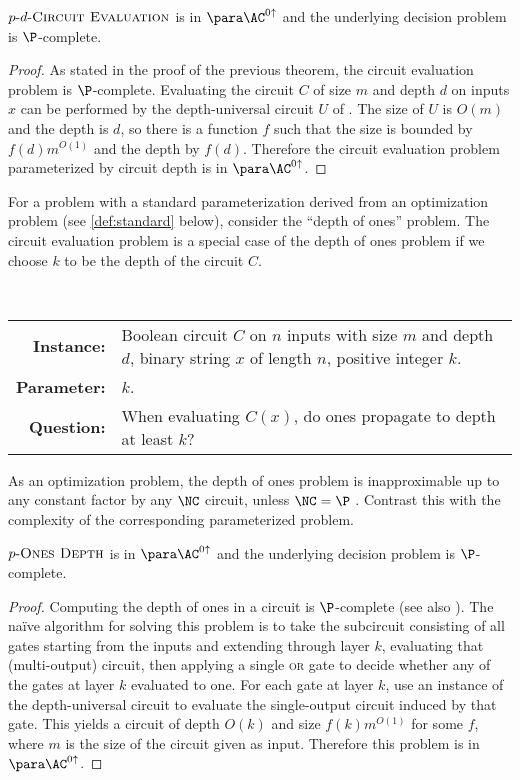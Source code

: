 \begin{theorem}\label{thm:cvpdepth}
  $p \textnormal{-} d \textnormal{-} \textsc{Circuit Evaluation}$ is in $\para \AC^{0 \uparrow}$ and the underlying decision problem is $\P$-complete.
\end{theorem}
\begin{proof}
  As stated in the proof of the previous theorem, the circuit evaluation problem is $\P$-complete.
  Evaluating the circuit $C$ of size $m$ and depth $d$ on inputs $x$ can be performed by the depth-universal circuit $U$ of \autocite{ch85}.
  The size of $U$ is $O(m)$ and the depth is $d$, so there is a function $f$ such that the size is bounded by $f(d) m^{O(1)}$ and the depth by $f(d)$.
  Therefore the circuit evaluation problem parameterized by circuit depth is in $\para \AC^{0 \uparrow}$.
\end{proof}

For a problem with a standard parameterization derived from an optimization problem (see \autoref{def:standard} below), consider the ``depth of ones'' problem.
The circuit evaluation problem is a special case of the depth of ones problem if we choose $k$ to be the depth of the circuit $C$.

\begin{definition}
  \mbox{} \\
  \begin{tabular}{r p{9.2cm}}
    \textbf{Instance:} & Boolean circuit $C$ on $n$ inputs with size $m$ and depth $d$, binary string $x$ of length $n$, positive integer $k$. \\
    \textbf{Parameter:} & $k$. \\
    \textbf{Question:} & When evaluating $C(x)$, do ones propagate to depth at least $k$?
  \end{tabular}
\end{definition}

As an optimization problem, the depth of ones problem is inapproximable up to any constant factor by any $\NC$ circuit, unless $\NC = \P$ \autocite{ks88}.
Contrast this with the complexity of the corresponding parameterized problem.

\begin{theorem}
  $p \textnormal{-} \textsc{Ones Depth}$ is in $\para \AC^{0 \uparrow}$ and the underlying decision problem is $\P$-complete.
\end{theorem}
\begin{proof}
  Computing the depth of ones in a circuit is $\P$-complete \autocite{ks88} (see also \autocite[Problem~A.1.10]{ghr95}).
  The naïve algorithm for solving this problem is to take the subcircuit consisting of all gates starting from the inputs and extending through layer $k$, evaluating that (multi-output) circuit, then applying a single \textsc{or} gate to decide whether any of the gates at layer $k$ evaluated to one.
  For each gate at layer $k$, use an instance of the depth-universal circuit to evaluate the single-output circuit induced by that gate.
  This yields a circuit of depth $O(k)$ and size $f(k) m^{O(1)}$ for some $f$, where $m$ is the size of the circuit given as input.
  Therefore this problem is in $\para \AC^{0\uparrow}$.
\end{proof}

